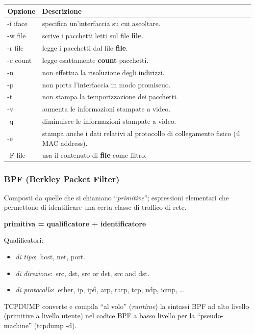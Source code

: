 \begin{table}[H]
    \centering
    \begin{tabular}{|l|m{28em}|}
        \hline
        Opzione  & Descrizione                                                                         \\\hline\hline
        -i iface & specifica un'interfaccia su cui ascoltare.                                          \\
        -w file  & scrive i pacchetti letti sul file \textbf{file}.                                    \\
        -r file  & legge i pacchetti dal file \textbf{file}.                                           \\
        -c count & legge esattamente \textbf{count} pacchetti.                                         \\
        -n       & non effettua la risoluzione degli indirizzi.                                        \\
        -p       & non porta l'interfaccia in modo promiscuo.                                          \\
        -t       & non stampa la temporizzazione dei pacchetti.                                        \\
        -v       & aumenta le informazioni stampate a video.                                           \\
        -q       & diminuisce le informazioni stampate a video.                                        \\
        -e       & stampa anche i dati relativi al protocollo di collegamento fisico (il MAC address). \\
        -F file  & usa il contenuto di \textbf{file} come filtro.                                      \\\hline
    \end{tabular}
\end{table}

\subsubsection{BPF (Berkley Packet Filter)}

Composti da quelle che si chiamano ``\emph{primitive}''; espressioni elementari che permettono di identificare una certa classe di traffico di rete.
\begin{center}
    \textbf{primitiva = qualificatore + identificatore}
\end{center}
Qualificatori:
\begin{itemize}
    \item \emph{di tipo}:\ host, net, port.
    \item \emph{di direzione}:\ src, dst, src or dst, src and dst.
    \item \emph{di protocollo}:\ ether, ip, ip6, arp, rarp, tcp, udp, icmp, \dots
\end{itemize}
TCPDUMP converte e compila ``al volo'' (\emph{runtime}) la sintassi BPF ad alto livello (primitive a livello utente) nel codice BPF a basso livello per la ``pseudo-machine'' (tcpdump -d).

